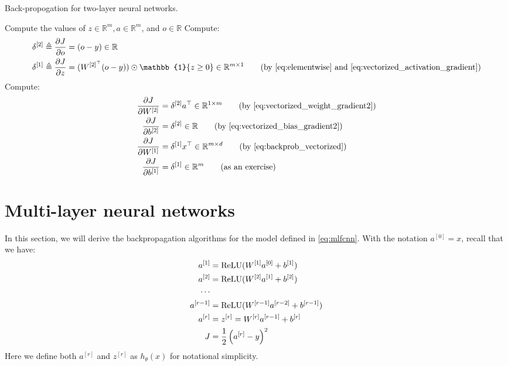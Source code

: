 \begin{algorithm}[ht]
    \caption{Back-propogation for two-layer neural networks.}
    \label{alg:backprop}
    \begin{algorithmic}
        \State Compute the values of $z \in \mathbb{R}^m , a \in \mathbb{R}^m$, and $o \in \mathbb{R}$
        \State Compute:
        \begin{align*}
            \delta^{[2]} &\triangleq \frac{\partial J}{\partial o} = (o - y) \in \mathbb{R}\\
            \delta^{[1]} &\triangleq \frac{\partial J}{\partial z} = (W^{[2]^\top} (o - y)) \odot \mathbb{1}\{z \ge 0\} \in \mathbb{R}^{m \times 1} \tag{by \cref{eq:elementwise} and \ref{eq:vectorized_activation_gradient}}
        \end{align*}
        \State Compute:
        \begin{align*}
            \frac{\partial J}{\partial W^{[2]}} &= \delta^{[2]} a^\top \in \mathbb{R}^{1 \times m} \tag{by \cref{eq:vectorized_weight_gradient2}}\\
            \frac{\partial J}{\partial b^{[2]}} &= \delta^{[2]} \in \mathbb{R} \tag{by \cref{eq:vectorized_bias_gradient2}}\\
            \frac{\partial J}{\partial W^{[1]}} &= \delta^{[1]} x^\top \in \mathbb{R}^{m \times d} \tag{by \cref{eq:backprob_vectorized}}\\
            \frac{\partial J}{\partial b^{[1]}} &= \delta^{[1]} \in \mathbb{R}^m \tag{as an exercise}
        \end{align*}
    \end{algorithmic}
\end{algorithm}

\section{Multi-layer neural networks}
In this section, we will derive the backpropagation algorithms for the model
defined in \cref{eq:mlfcnn}. With the notation $a^{[0]} = x$, recall that we have:
\begin{align*}
    a^{[1]} &= \operatorname{ReLU}(W^{[1]} a^{[0]} + b^{[1]})\\
    a^{[2]} &= \operatorname{ReLU}(W^{[2]} a^{[1]} + b^{[2]})\\
    \cdots&\\
    a^{[r-1]} &= \operatorname{ReLU}(W^{[r-1]} a^{[r-2]} + b^{[r-1]})\\
    a^{[r]} &= z^{[r]} = W^{[r]} a^{[r-1]} + b^{[r]}\\
    J &= \frac{1}{2} \left(a^{[r]} - y\right)^2
\end{align*}
Here we define both $a^{[r]}$ and $z^{[r]}$ as $h_\theta(x)$ for notational simplicity.

